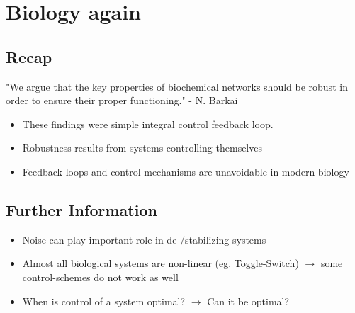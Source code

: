 \section{Biology again}
\label{sec:biology-again}
\subsection{Recap}
\label{subsec:}
\begin{frame}{\insertsubsection}
    "We argue that the key properties of biochemical networks should be robust in order to ensure their proper functioning." - N. Barkai~\cite{Barkai1997}
    \begin{itemize}[<+->]
        \item These findings were simple integral control feedback loop.
        \item Robustness results from systems controlling themselves
        \item Feedback loops and control mechanisms are unavoidable in modern biology
    \end{itemize}
\end{frame}
%
%
\subsection{Further Information}
\begin{frame}{\insertsubsection}
    \begin{itemize}[<+->]
        \item Noise can play important role in de-/stabilizing systems
        \item Almost all biological systems are non-linear (eg. Toggle-Switch) $\rightarrow$ some control-schemes do not work as well
        \item When is control of a system optimal? $\rightarrow$ Can it be optimal?
    \end{itemize}
\end{frame}